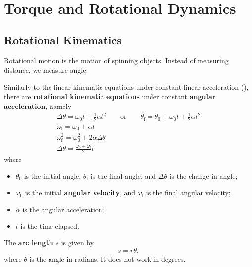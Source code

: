 \chapter{Torque and Rotational Dynamics}


\section{Rotational Kinematics}

Rotational motion is the motion of spinning objects.
Instead of measuring distance, we measure angle.

Similarly to the linear kinematic equations under constant linear
acceleration (),
there are \textbf{rotational kinematic equations} under constant
\textbf{angular acceleration},
namely
\begin{subequations}
    \begin{gather}
        {
            \Delta{\theta} = \omega_0 t + \frac{1}{2} \alpha t^2
            \qquad \mathrm{or} \qquad
            \theta_\mathrm{f} = \theta_0 + \omega_0 t + \frac{1}{2} \alpha t^2
        } \\
        \omega_\mathrm{f} = \omega_0 + \alpha t \\
        \omega_\mathrm{f}^2 = \omega_0^2 + 2 \alpha \Delta{\theta} \\
        \Delta{\theta} = \frac{\omega_0 + \omega_\mathrm{f}}{2} t
    \end{gather}
\end{subequations}
where
\begin{itemize}
    \item \(\theta_0\) is the initial angle,
        \(\theta_\mathrm{f}\) is the final angle,
        and \(\Delta{\theta}\) is the change in angle;
    \item \(\omega_0\) is the initial \textbf{angular velocity},
        and \(\omega_\mathrm{f}\) is the final angular velocity;
    \item \(\alpha\) is the angular acceleration;
    \item \(t\) is the time elapsed.
\end{itemize}

The \textbf{arc length} \(s\) is given by
\begin{equation}
    s = r \theta,
\end{equation}
where \(\theta\) is the angle in radians.
It does not work in degrees.

